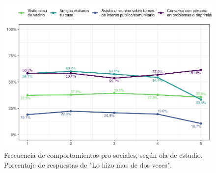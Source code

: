 \documentclass[
  12pt,
]{book}
\begin{document}
\begin{figure}

{\centering \includegraphics{reporte-elsoc_files/figure-latex/dist-pros-1} 

}

\caption{Frecuencia de comportamientos pro-sociales, según ola de estudio. Porcentaje de respuestas de "Lo hizo mas de dos veces".}\label{fig:dist-pros}
\end{figure}
\end{document}
